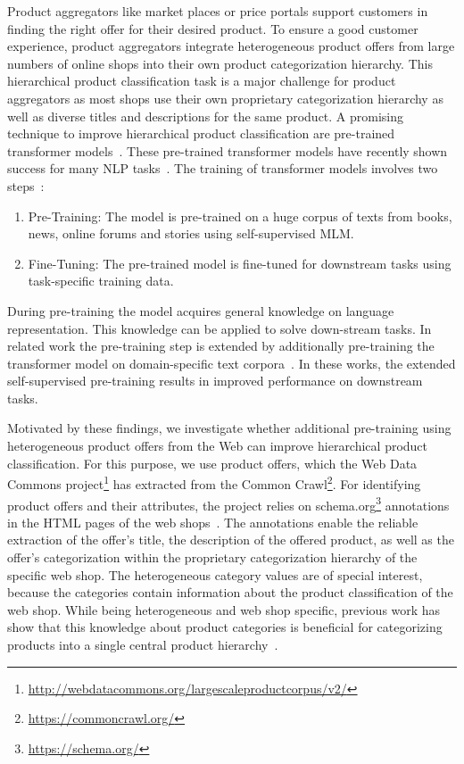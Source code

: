 \documentclass[11pt,dvipdfm]{article}
\begin{document}
Product aggregators like market places or price portals support customers in finding the right offer for their desired product.
To ensure a good customer experience, product aggregators integrate heterogeneous product offers from large numbers of online shops into their own product categorization hierarchy.
This hierarchical product classification task is a major challenge for product aggregators as most shops use their own proprietary categorization hierarchy as well as diverse titles and descriptions for the same product. 
A promising technique to improve hierarchical product classification are pre-trained transformer models~\cite{zhang_e-bert_2020, yang_bert_2020}.
These pre-trained transformer models have recently shown success for many NLP tasks~\cite{ devlin_bert_2019, liu_roberta_2019, yang_xlnet_2020, raffel_exploring_2020, dong_unified_2019, lan_albert_2020}.
The training of transformer models involves two steps~\cite{devlin_bert_2019, liu_roberta_2019}:
\begin{enumerate}
  \item Pre-Training: The model is pre-trained on a huge corpus of texts from books, news, online forums and stories using self-supervised \ac{MLM}.
  \item Fine-Tuning: The pre-trained model is fine-tuned for downstream tasks using task-specific training data.
\end{enumerate}

During pre-training the model acquires general knowledge on language representation.
This knowledge can be applied to solve down-stream tasks.
In related work the pre-training step is extended by additionally pre-training the transformer model on domain-specific text corpora~\cite{lee_biobert_2019, zhang_e-bert_2020,beltagy_scibert_2019,gururangan_dont_2020}.
In these works, the extended self-supervised pre-training results in improved performance on downstream tasks.

Motivated by these findings, we investigate whether additional pre-training using heterogeneous product offers from the Web can improve hierarchical product classification.
For this purpose, we use product offers, which the Web Data Commons project\footnote{\url{http://webdatacommons.org/largescaleproductcorpus/v2/}} has extracted from the Common Crawl\footnote{\url{https://commoncrawl.org/}}. 
For identifying product offers and their attributes, the project relies on schema.org\footnote{\url{https://schema.org/}} annotations in the HTML pages of the web shops~\cite{primpeli_wdc_2019}. 
The annotations enable the reliable extraction of the offer's title, the description of the offered product, as well as the offer's categorization within the proprietary categorization hierarchy of the specific web shop.  
The heterogeneous category values are of special interest, because the categories contain information about the product classification of the web shop. 
While being heterogeneous and web shop specific, previous work has show that this knowledge about product categories is beneficial for categorizing products into a single central product hierarchy~\cite{meusel_exploiting_2015, zhang_product_2019}.
\end{document}
